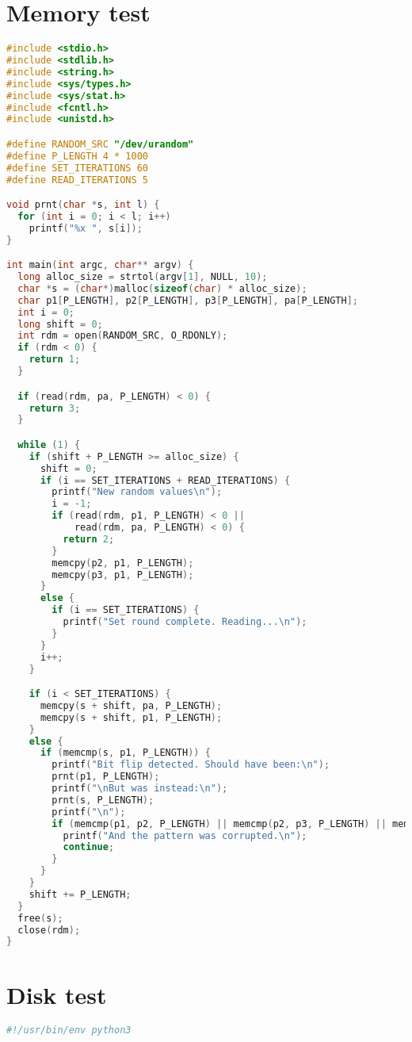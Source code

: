 \begin{appendices}

\section{Memory test}\label{Apdx-memory}
\begin{lstlisting}[language=C]
#include <stdio.h>
#include <stdlib.h>
#include <string.h>
#include <sys/types.h>
#include <sys/stat.h>
#include <fcntl.h>
#include <unistd.h>

#define RANDOM_SRC "/dev/urandom"
#define P_LENGTH 4 * 1000
#define SET_ITERATIONS 60
#define READ_ITERATIONS 5

void prnt(char *s, int l) {
  for (int i = 0; i < l; i++)
    printf("%x ", s[i]);
}

int main(int argc, char** argv) {
  long alloc_size = strtol(argv[1], NULL, 10);
  char *s = (char*)malloc(sizeof(char) * alloc_size);
  char p1[P_LENGTH], p2[P_LENGTH], p3[P_LENGTH], pa[P_LENGTH];
  int i = 0;
  long shift = 0;
  int rdm = open(RANDOM_SRC, O_RDONLY);
  if (rdm < 0) {
    return 1;
  }

  if (read(rdm, pa, P_LENGTH) < 0) {
    return 3;
  }

  while (1) {
    if (shift + P_LENGTH >= alloc_size) {
      shift = 0;
      if (i == SET_ITERATIONS + READ_ITERATIONS) {
        printf("New random values\n");
        i = -1;
        if (read(rdm, p1, P_LENGTH) < 0 ||
            read(rdm, pa, P_LENGTH) < 0) {
          return 2;
        }
        memcpy(p2, p1, P_LENGTH);
        memcpy(p3, p1, P_LENGTH);
      }
      else {
        if (i == SET_ITERATIONS) {
          printf("Set round complete. Reading...\n");
        }
      }
      i++;
    }

    if (i < SET_ITERATIONS) {
      memcpy(s + shift, pa, P_LENGTH);
      memcpy(s + shift, p1, P_LENGTH);
    }
    else {
      if (memcmp(s, p1, P_LENGTH)) {
        printf("Bit flip detected. Should have been:\n");
        prnt(p1, P_LENGTH);
        printf("\nBut was instead:\n");
        prnt(s, P_LENGTH);
        printf("\n");
        if (memcmp(p1, p2, P_LENGTH) || memcmp(p2, p3, P_LENGTH) || memcmp(p1, p3, P_LENGTH)) {
          printf("And the pattern was corrupted.\n");
          continue;
        }
      }
    }
    shift += P_LENGTH;
  }
  free(s);
  close(rdm);
}
\end{lstlisting}

\section{Disk test}\label{Apdx-disk}
\begin{lstlisting}[language=Python]
#!/usr/bin/env python3


\end{lstlisting}
\end{appendices}
